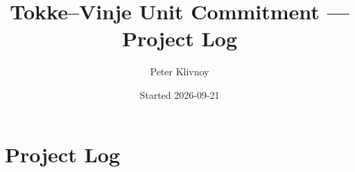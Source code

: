 \documentclass[11pt]{article}
\title{Tokke--Vinje Unit Commitment --- Project Log}
\author{Peter Klivnoy}
\date{Started 2026-09-21}
\begin{document}
\maketitle
\tableofcontents

\section{Project Log}





































\end{document}
